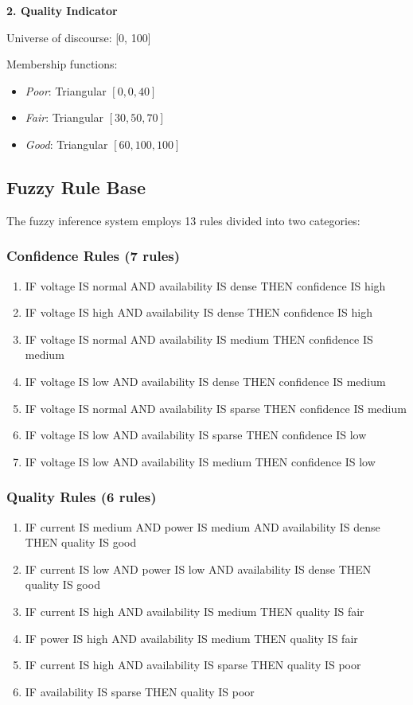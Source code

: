 \documentclass[12pt,a4paper]{report}
\begin{document}
\textbf{2. Quality Indicator}

Universe of discourse: [0, 100]

Membership functions:
\begin{itemize}
    \item \textit{Poor}: Triangular $[0, 0, 40]$
    \item \textit{Fair}: Triangular $[30, 50, 70]$
    \item \textit{Good}: Triangular $[60, 100, 100]$
\end{itemize}

\subsection{Fuzzy Rule Base}

The fuzzy inference system employs 13 rules divided into two categories:

\subsubsection{Confidence Rules (7 rules)}

\begin{enumerate}
    \item IF voltage IS normal AND availability IS dense THEN confidence IS high
    \item IF voltage IS high AND availability IS dense THEN confidence IS high
    \item IF voltage IS normal AND availability IS medium THEN confidence IS medium
    \item IF voltage IS low AND availability IS dense THEN confidence IS medium
    \item IF voltage IS normal AND availability IS sparse THEN confidence IS medium
    \item IF voltage IS low AND availability IS sparse THEN confidence IS low
    \item IF voltage IS low AND availability IS medium THEN confidence IS low
\end{enumerate}

\subsubsection{Quality Rules (6 rules)}

\begin{enumerate}
    \item IF current IS medium AND power IS medium AND availability IS dense THEN quality IS good
    \item IF current IS low AND power IS low AND availability IS dense THEN quality IS good
    \item IF current IS high AND availability IS medium THEN quality IS fair
    \item IF power IS high AND availability IS medium THEN quality IS fair
    \item IF current IS high AND availability IS sparse THEN quality IS poor
    \item IF availability IS sparse THEN quality IS poor
\end{enumerate}
\end{document}

